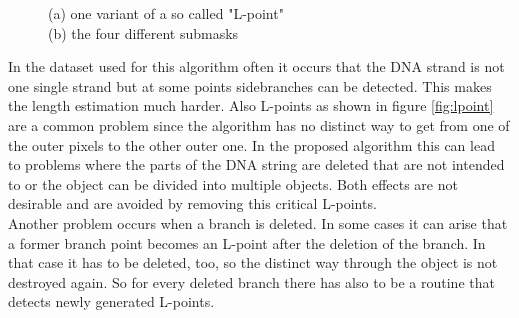 \documentclass{article}
\begin{document}
\begin{figure}[H]
\begin{subfigure}[b]{0.36\textwidth}
		\caption{}
		\label{fig:lpoint_mask}
	\end{subfigure}
	\captionsetup{justification=centering}
	\caption{(a) one variant of a so called "L-point" \\(b) the four different submasks }
	\label{fig:lpoint_overview} %
\end{figure}
In the dataset used for this algorithm often it occurs that the DNA strand is not one single strand but at some points sidebranches can be detected. This makes the length estimation much harder. Also L-points as shown in figure 
\ref{fig:lpoint} are a common problem since the algorithm has no distinct way to get from one of the outer pixels to the other outer one. In the proposed algorithm this can lead to problems where the parts of the DNA string are deleted that are not intended to or the object can be divided into multiple objects. Both effects are not desirable and are avoided by removing this critical L-points. \\
Another problem occurs when a branch is deleted. In some cases it can arise that a former branch point becomes an L-point after the deletion of the branch. In that case it has to be deleted, too, so the distinct way through the object is not destroyed again. So for every deleted branch there has also to be a routine that detects newly generated L-points.
\end{document}
